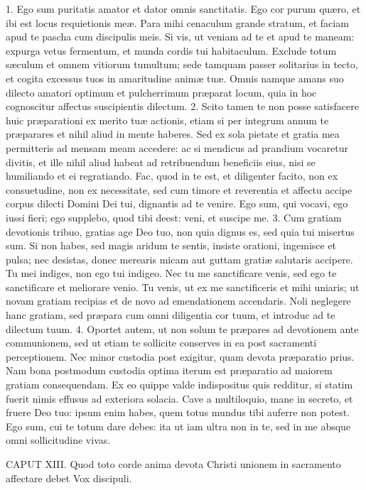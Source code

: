 \documentclass[twoside]{article}
\begin{document}
1. Ego sum puritatis amator et dator omnis sanctitatis. Ego cor purum quæro, et ibi est locus requietionis meæ. Para mihi cenaculum grande stratum, et faciam apud te pascha cum discipulis meis. Si vis, ut veniam ad te et apud te maneam: expurga vetus fermentum, et munda cordis tui habitaculum. Exclude totum sæculum et omnem vitiorum tumultum; sede tamquam passer solitarius in tecto, et cogita excessus tuos in amaritudine animæ tuæ. Omnis namque amans suo dilecto amatori optimum et pulcherrimum præparat locum, quia in hoc cognoscitur affectus suscipientis dilectum.
2. Scito tamen te non posse satisfacere huic præparationi ex merito tuæ actionis, etiam si per integrum annum te præparares et nihil aliud in mente haberes. Sed ex sola pietate et gratia mea permitteris ad mensam meam accedere: ac si mendicus ad prandium vocaretur divitis, et ille nihil aliud habeat ad retribuendum beneficiis eius, nisi se humiliando et ei regratiando. Fac, quod in te est, et diligenter facito, non ex consuetudine, non ex necessitate, sed cum timore et reverentia et affectu accipe corpus dilecti Domini Dei tui, dignantis ad te venire. Ego sum, qui vocavi, ego iussi fieri; ego supplebo, quod tibi deest: veni, et suscipe me.
3. Cum gratiam devotionis tribuo, gratias age Deo tuo, non quia dignus es, sed quia tui misertus sum. Si non habes, sed magis aridum te sentis, insiste orationi, ingemisce et pulsa; nec desistas, donec merearis micam aut guttam gratiæ salutaris accipere. Tu mei indiges, non ego tui indigeo. Nec tu me sanctificare venis, sed ego te sanctificare et meliorare venio. Tu venis, ut ex me sanctificeris et mihi uniaris; ut novam gratiam recipias et de novo ad emendationem accendaris. Noli neglegere hanc gratiam, sed præpara cum omni diligentia cor tuum, et introduc ad te dilectum tuum.
4. Oportet autem, ut non solum te præpares ad devotionem ante communionem, sed ut etiam te sollicite conserves in ea post sacramenti perceptionem. Nec minor custodia post exigitur, quam devota præparatio prius. Nam bona postmodum custodia optima iterum est præparatio ad maiorem gratiam consequendam. Ex eo quippe valde indispositus quis redditur, si statim fuerit nimis effusus ad exteriora solacia. Cave a multiloquio, mane in secreto, et fruere Deo tuo: ipsum enim habes, quem totus mundus tibi auferre non potest. Ego sum, cui te totum dare debes: ita ut iam ultra non in te, sed in me absque omni sollicitudine vivas.


CAPUT XIII.
Quod toto corde anima devota Christi unionem in sacramento affectare debet
Vox discipuli.
\end{document}
